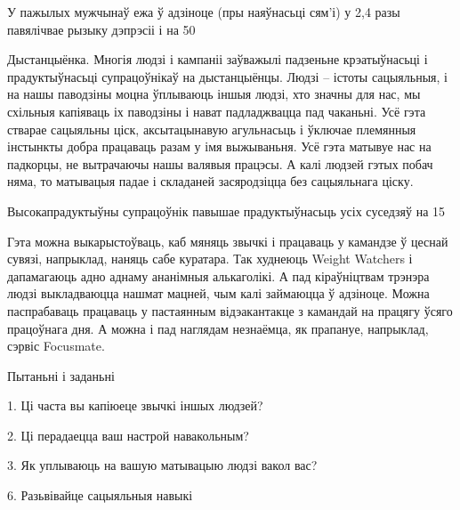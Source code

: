 У пажылых мужчынаў ежа ў адзіноце (пры наяўнасьці сям'і) у 2,4 разы павялічвае рызыку дэпрэсіі і на 50%

Дыстанцыёнка. Многія людзі і кампаніі заўважылі падзеньне крэатыўнасьці і прадуктыўнасьці супрацоўнікаў на дыстанцыёнцы. Людзі – істоты сацыяльныя, і на нашы паводзіны моцна ўплываюць іншыя людзі, хто значны для нас, мы схільныя капіяваць іх паводзіны і нават падладжвацца пад чаканьні. Усё гэта стварае сацыяльны ціск, аксытацынавую агульнасьць і ўключае племянныя інстынкты добра працаваць разам у імя выжываньня. Усё гэта матывуе нас на падкорцы, не вытрачаючы нашы валявыя працэсы. А калі людзей гэтых побач няма, то матывацыя падае і складаней засяродзіцца без сацыяльнага ціску.

Высокапрадуктыўны супрацоўнік павышае прадуктыўнасьць усіх суседзяў на 15%

Гэта можна выкарыстоўваць, каб мяняць звычкі і працаваць у камандзе ў цеснай сувязі, напрыклад, наняць сабе куратара. Так худнеюць Weight Watchers і дапамагаюць адно аднаму ананімныя алькаголікі. А пад кіраўніцтвам трэнэра людзі выкладваюцца нашмат мацней, чым калі займаюцца ў адзіноце. Можна паспрабаваць працаваць у пастаянным відэакантакце з камандай на працягу ўсяго працоўнага дня. А можна і пад наглядам незнаёмца, як прапануе, напрыклад, сэрвіс Focusmate.

Пытаньні і заданьні

1. Ці часта вы капіюеце звычкі іншых людзей?

2. Ці перадаецца ваш настрой навакольным?

3. Як уплываюць на вашую матывацыю людзі вакол вас?


6. Разьвівайце сацыяльныя навыкі

